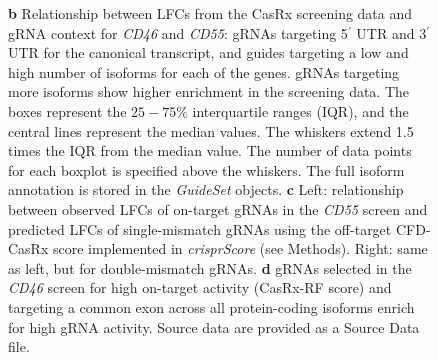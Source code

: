 \documentclass[pdftex,english,10pt]{article}
\begin{document}
{\begin{figure}
{\textbf{b} Relationship between LFCs from the CasRx screening data and gRNA context for \textit{CD46} and \textit{CD55}: gRNAs targeting 5$^\prime$ UTR and 3$^\prime$ UTR for the canonical transcript, and guides targeting a low and high number of isoforms for each of the genes. gRNAs targeting more isoforms show higher enrichment in the screening data.  
The boxes represent the $25-75\%$ interquartile ranges (IQR), and the central lines represent the median values. The whiskers extend 1.5 times the IQR from the median value. 
The number of data points for each boxplot is specified above the whiskers. The full isoform annotation is stored in the \textit{GuideSet} objects. 
\textbf{c} Left: relationship between observed LFCs of on-target gRNAs in the \textit{CD55} screen and predicted LFCs of single-mismatch gRNAs using the off-target CFD-CasRx score implemented in \textit{crisprScore} (see Methods). Right: same as left, but for double-mismatch gRNAs.
\textbf{d} gRNAs selected in the \textit{CD46} screen for high on-target activity (CasRx-RF score) and targeting a common exon across all protein-coding isoforms enrich for high gRNA activity. Source data are provided as a Source Data file.}
  \label{fig:casrx}
\end{figure}




}
\end{document}

